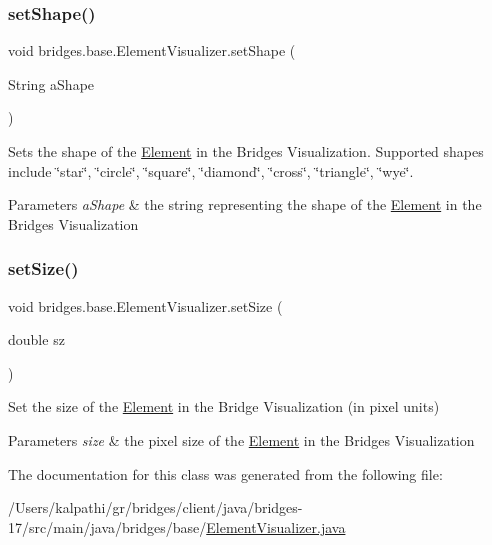\subsubsection{\texorpdfstring{set\+Shape()}{setShape()}}
{\footnotesize\ttfamily void bridges.\+base.\+Element\+Visualizer.\+set\+Shape (\begin{DoxyParamCaption}\item[{String}]{a\+Shape }\end{DoxyParamCaption})}

Sets the shape of the \mbox{\hyperlink{classbridges_1_1base_1_1_element}{Element}} in the Bridges Visualization. Supported shapes include \char`\"{}star\char`\"{}, \char`\"{}circle\char`\"{}, \char`\"{}square\char`\"{}, \char`\"{}diamond\char`\"{}, \char`\"{}cross\char`\"{}, \char`\"{}triangle\char`\"{}, \char`\"{}wye\char`\"{}.


\begin{DoxyParams}{Parameters}
{\em a\+Shape} & the string representing the shape of the \mbox{\hyperlink{classbridges_1_1base_1_1_element}{Element}} in the Bridges Visualization \\
\hline
\end{DoxyParams}
\mbox{\label{classbridges_1_1base_1_1_element_visualizer_aba410184f7df495594fc1fa7948335a5}} 
\subsubsection{\texorpdfstring{set\+Size()}{setSize()}}
{\footnotesize\ttfamily void bridges.\+base.\+Element\+Visualizer.\+set\+Size (\begin{DoxyParamCaption}\item[{double}]{sz }\end{DoxyParamCaption})}

Set the size of the \mbox{\hyperlink{classbridges_1_1base_1_1_element}{Element}} in the Bridge Visualization (in pixel units)


\begin{DoxyParams}{Parameters}
{\em size} & the pixel size of the \mbox{\hyperlink{classbridges_1_1base_1_1_element}{Element}} in the Bridges Visualization \\
\hline
\end{DoxyParams}


The documentation for this class was generated from the following file\+:\begin{DoxyCompactItemize}
\item 
/\+Users/kalpathi/gr/bridges/client/java/bridges-\/17/src/main/java/bridges/base/\mbox{\hyperlink{_element_visualizer_8java}{Element\+Visualizer.\+java}}\end{DoxyCompactItemize}
